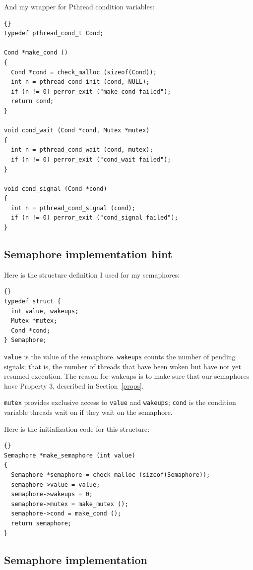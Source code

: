 \documentclass{book}
\newcommand{\clearemptydoublepage}{\newpage\cleardoublepage}
\begin{document}
\newpage
And my wrapper for Pthread condition variables:

\begin{lstlisting}[caption={}]{}
typedef pthread_cond_t Cond;

Cond *make_cond ()
{
  Cond *cond = check_malloc (sizeof(Cond)); 
  int n = pthread_cond_init (cond, NULL);
  if (n != 0) perror_exit ("make_cond failed");
  return cond;
}

void cond_wait (Cond *cond, Mutex *mutex)
{
  int n = pthread_cond_wait (cond, mutex);
  if (n != 0) perror_exit ("cond_wait failed");
}

void cond_signal (Cond *cond)
{
  int n = pthread_cond_signal (cond);
  if (n != 0) perror_exit ("cond_signal failed");
}
\end{lstlisting}



\clearemptydoublepage
\subsection{Semaphore implementation hint}

Here is the structure definition I used for my semaphores:

\begin{lstlisting}[caption={}]{}
typedef struct {
  int value, wakeups;
  Mutex *mutex;
  Cond *cond;
} Semaphore;
\end{lstlisting}

{\tt value} is the value of the semaphore.  {\tt wakeups} counts
the number of pending signals; that is, the number of threads
that have been woken but have not yet resumed execution.  The reason
for wakeups is to make sure that our semaphores have
Property 3, described in Section~\ref{props}.

{\tt mutex} provides exclusive access to {\tt value} and
{\tt wakeups}; {\tt cond} is the condition variable threads
wait on if they wait on the semaphore.

Here is the initialization code for this structure:

\begin{lstlisting}[caption={}]{}
Semaphore *make_semaphore (int value)
{
  Semaphore *semaphore = check_malloc (sizeof(Semaphore));
  semaphore->value = value;
  semaphore->wakeups = 0;
  semaphore->mutex = make_mutex ();
  semaphore->cond = make_cond ();
  return semaphore;
}
\end{lstlisting}


\clearemptydoublepage
\subsection{Semaphore implementation}
\end{document}
